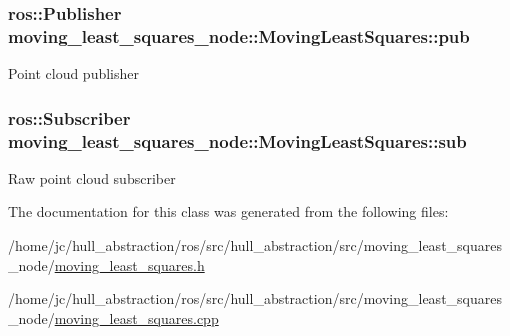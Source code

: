 \subsubsection[{\texorpdfstring{pub}{pub}}]{\setlength{\rightskip}{0pt plus 5cm}ros\+::\+Publisher moving\+\_\+least\+\_\+squares\+\_\+node\+::\+Moving\+Least\+Squares\+::pub\hspace{0.3cm}{\ttfamily [private]}}\hypertarget{classmoving__least__squares__node_1_1_moving_least_squares_a575c8db3fd78dc6e4bfd432d2d75916c}{}\label{classmoving__least__squares__node_1_1_moving_least_squares_a575c8db3fd78dc6e4bfd432d2d75916c}
Point cloud publisher 
\subsubsection[{\texorpdfstring{sub}{sub}}]{\setlength{\rightskip}{0pt plus 5cm}ros\+::\+Subscriber moving\+\_\+least\+\_\+squares\+\_\+node\+::\+Moving\+Least\+Squares\+::sub\hspace{0.3cm}{\ttfamily [private]}}\hypertarget{classmoving__least__squares__node_1_1_moving_least_squares_a3afb046b92a8d8df03d06542ba9fc9bd}{}\label{classmoving__least__squares__node_1_1_moving_least_squares_a3afb046b92a8d8df03d06542ba9fc9bd}
Raw point cloud subscriber 

The documentation for this class was generated from the following files\+:\begin{DoxyCompactItemize}
\item 
/home/jc/hull\+\_\+abstraction/ros/src/hull\+\_\+abstraction/src/moving\+\_\+least\+\_\+squares\+\_\+node/\hyperlink{moving__least__squares_8h}{moving\+\_\+least\+\_\+squares.\+h}\item 
/home/jc/hull\+\_\+abstraction/ros/src/hull\+\_\+abstraction/src/moving\+\_\+least\+\_\+squares\+\_\+node/\hyperlink{moving__least__squares_8cpp}{moving\+\_\+least\+\_\+squares.\+cpp}\end{DoxyCompactItemize}
